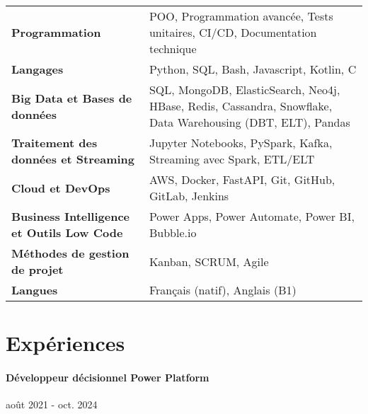 \documentclass{article}
\begin{document}
\begin{tabularx}{\textwidth}{@{}lX@{}}

  \textbf{Programmation} & POO, Programmation avancée, Tests unitaires, CI/CD, Documentation technique \\
  \addlinespace[5pt] %

  \textbf{Langages} & Python, SQL, Bash, Javascript, Kotlin, C \\
  \addlinespace[5pt] %

  \textbf{Big Data et Bases de données} & SQL, MongoDB, ElasticSearch, Neo4j, HBase, Redis, Cassandra, Snowflake, Data Warehousing (DBT, ELT), Pandas \\
  \addlinespace[5pt] %

  \textbf{Traitement des données et Streaming} & Jupyter Notebooks, PySpark, Kafka, Streaming avec Spark, ETL/ELT \\
  \addlinespace[5pt] %

  \textbf{Cloud et DevOps} & AWS, Docker, FastAPI, Git, GitHub, GitLab, Jenkins \\
  \addlinespace[5pt] %

  \textbf{Business Intelligence et Outils Low Code} & Power Apps, Power Automate, Power BI, Bubble.io \\
  \addlinespace[5pt] %

  \textbf{Méthodes de gestion de projet} & Kanban, SCRUM, Agile \\
  \addlinespace[5pt] %

  \textbf{Langues} & Français (natif), Anglais (B1)
\end{tabularx}


\vspace{4ex}
\hrulefill
\section*{Expériences}

\paragraph{Développeur décisionnel Power Platform}\hspace*{\fill}août 2021 - oct. 2024
\end{document}
